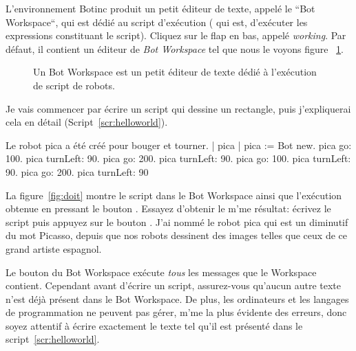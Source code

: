 \documentclass[a4paper,10pt,twoside]{book}
\begin{document}
L'environnement Botinc produit un petit \'editeur de texte, appel\'e le ``Bot Workspace``, qui est d\'edi\'e au script d'ex\'ecution ( qui est, d'ex\'ecuter les expressions constituant le script). Cliquez sur le flap en bas, appel\'e \emph{working}. Par d\'efaut, il contient un \'editeur de \emph{Bot Workspace} tel que nous le voyons figure ~\ref{fig:TurtleWorkspace}. 

\begin{figure}[!h]
\caption{Un Bot Workspace est un petit \'editeur de texte d\'edi\'e \`a l'ex\'ecution de script de robots. 
  \label{fig:TurtleWorkspace}}
\end{figure}

Je vais commencer par \'ecrire un script qui dessine un rectangle, puis j'expliquerai cela en d\'etail (Script~\ref{scr:helloworld}). 


\begin{script}[helloworld]{Le robot pica a \'et\'e cr\'e\'e pour bouger et tourner.}
	| pica | 
	pica := Bot new. 
	pica go: 100. 
	pica turnLeft: 90. 
	pica go: 200. 
	pica turnLeft: 90. 
	pica go: 100. 
	pica turnLeft: 90. 
	pica go: 200. 
	pica turnLeft: 90
\end{script}

La figure~\ref{fig:doit} montre le script dans le Bot Workspace ainsi que l'ex\'ecution obtenue en pressant le bouton . Essayez d'obtenir le m'me r\'esultat: \'ecrivez le script puis appuyez sur le bouton . J'ai nomm\'e le robot pica qui est un diminutif du mot Picasso, depuis que nos robots dessinent des images telles que ceux de ce grand artiste espagnol.

Le bouton  du Bot Workspace ex\'ecute \emph{tous} les messages que le Workspace contient. Cependant avant d'\'ecrire un script, assurez-vous qu'aucun autre texte n'est d\'ej\`a pr\'esent dans le Bot Workspace. De plus, les ordinateurs et les langages de programmation ne peuvent pas g\'erer, m'me la plus \'evidente des erreurs, donc soyez attentif \`a \'ecrire exactement le texte tel qu'il est pr\'esent\'e dans le script~\ref{scr:helloworld}. 
\end{document}
